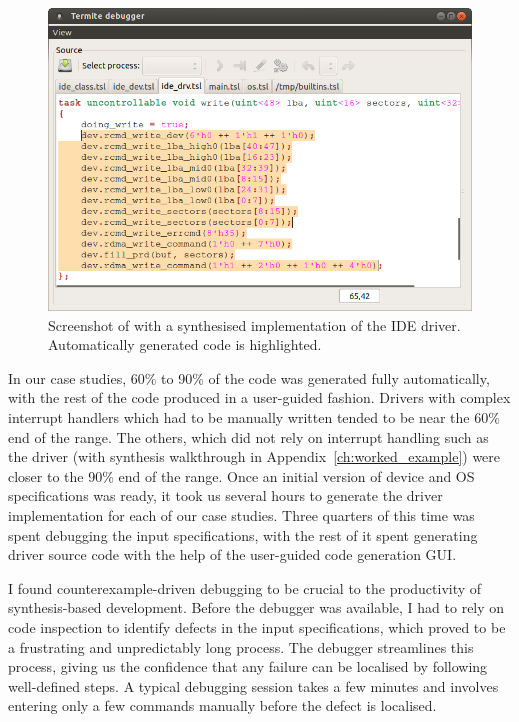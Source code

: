 \begin{figure}
    \center
    \includegraphics[width=\linewidth]{imgs/screenshot_write.png}
    \caption{Screenshot of \termite with a synthesised implementation of the IDE driver.  Automatically generated code is highlighted.}
    \label{f:screenshot_write}
\end{figure}

In our case studies, 60\% to 90\% of the code was generated fully automatically, with the rest of the code produced in a user-guided fashion. Drivers with complex interrupt handlers which had to be manually written tended to be near the 60\% end of the range. The others, which did not rely on interrupt handling such as the \iic driver (with synthesis walkthrough in Appendix~\ref{ch:worked_example}) were closer to the 90\% end of the range. Once an initial version of device and OS specifications was ready, it took us several hours to generate the driver implementation for each of our case studies.  Three quarters of this time was spent debugging the input specifications, with the rest of it spent generating driver source code with the help of the user-guided code generation GUI.

I found counterexample-driven debugging to be crucial to the productivity of synthesis-based development.  Before the debugger was available, I had to rely on code inspection to identify defects in the input specifications, which proved to be a frustrating and unpredictably long process.  The \termite debugger streamlines this process, giving us the confidence that any failure can be localised by following well-defined steps.  A typical debugging session takes a few minutes and involves entering only a few commands manually before the defect is localised. 


